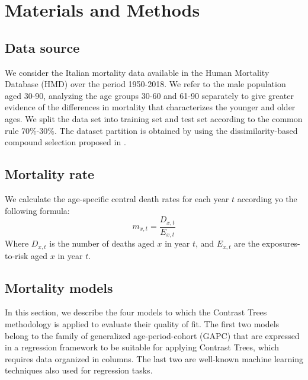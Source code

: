\documentclass[fleqn,10pt]{wlscirep}
\begin{document}
\section*{Materials and Methods}

\subsection*{Data source}

We consider the Italian mortality data available in the Human Mortality Database (HMD) over the period 1950-2018. We refer to the male population aged 30-90, analyzing the age groups 30-60 and 61-90 separately to give greater evidence of the differences in mortality that characterizes the younger and older ages.
We split the data set into training set and test set according to the common rule 70\%-30\%. The dataset partition is obtained by using the dissimilarity-based compound selection proposed in \cite{Willett1999}.

\subsection*{Mortality rate}
We calculate the age-specific central death rates for each year $t$ according yo the following formula:
\begin{equation} 
\label{eq:mxt}
m_{x,t}=\frac{D_{x,t}}{E_{x,t}}
\end{equation}
Where $D_{x,t}$ is the number of deaths aged $x$ in year $t$, and $E_{x,t}$ are the exposures-to-risk aged $x$ in year $t$.

\subsection*{Mortality models}
In this section, we describe the four models to which the Contrast Trees methodology is applied to evaluate their quality of fit.
The first two models belong to the family of generalized age-period-cohort (GAPC) that are expressed in a regression framework to be suitable for applying Contrast Trees, which requires data organized in columns. The last two are well-known machine learning techniques also used for regression tasks.
\end{document}
